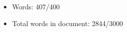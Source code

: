 \documentclass[12pt]{article}
\numberwithin{equation}{section}
\begin{document}
\begin{flushleft}
\begin{itemize}
  \item Words: 407/400
  \item Total words in document: 2844/3000
\end{itemize}


\end{flushleft}
\end{document}
